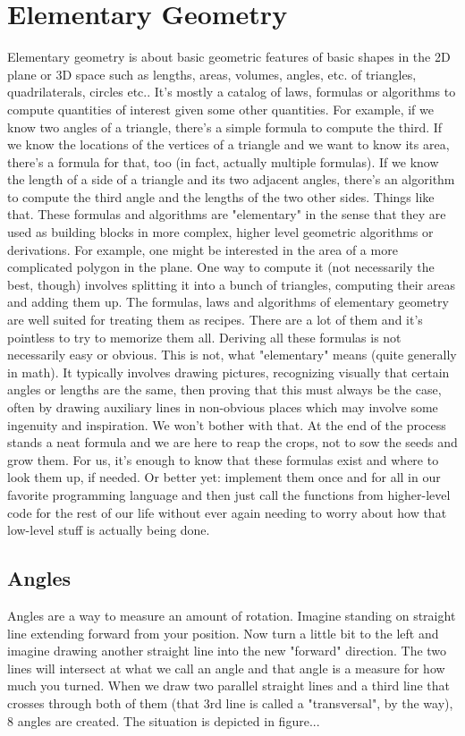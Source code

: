 \section{Elementary Geometry}
Elementary geometry is about basic geometric features of basic shapes in the 2D plane or 3D space such as lengths, areas, volumes, angles, etc. of triangles, quadrilaterals, circles etc.. It's mostly a catalog of laws, formulas or algorithms to compute quantities of interest given some other quantities. For example, if we know two angles of a triangle, there's a simple formula to compute the third. If we know the locations of the vertices of a triangle and we want to know its area, there's a formula for that, too (in fact, actually multiple formulas). If we know the length of a side of a triangle and its two adjacent angles, there's an algorithm to compute the third angle and the lengths of the two other sides. Things like that. These formulas and algorithms are "elementary" in the sense that they are used as building blocks in more complex, higher level geometric algorithms or derivations. For example, one might be interested in the area of a more complicated polygon in the plane. One way to compute it (not necessarily the best, though) involves splitting it into a bunch of triangles, computing their areas and adding them up. The formulas, laws and algorithms of elementary geometry are well suited for treating them as recipes. There are a lot of them and it's pointless to try to memorize them all. Deriving all these formulas is not necessarily easy or obvious. This is not, what "elementary" means (quite generally in math). It typically involves drawing pictures, recognizing visually that certain angles or lengths are the same, then proving that this must always be the case, often by drawing auxiliary lines in non-obvious places which may involve some ingenuity and inspiration. We won't bother with that. At the end of the process stands a neat formula and we are here to reap the crops, not to sow the seeds and grow them. For us, it's enough to know that these formulas exist and where to look them up, if needed. Or better yet: implement them once and for all in our favorite programming language and then just call the functions from higher-level code for the rest of our life without ever again needing to worry about how that low-level stuff is actually being done. 

\subsection{Angles}
Angles are a way to measure an amount of rotation. Imagine standing on straight line extending forward from your position. Now turn a little bit to the left and imagine drawing another straight line into the new "forward" direction. The two lines will intersect at what we call an angle and that angle is a measure for how much you turned. When we draw two parallel straight lines and a third line that crosses through both of them (that 3rd line is called a "transversal", by the way), 8 angles are created. The situation is depicted in figure...

